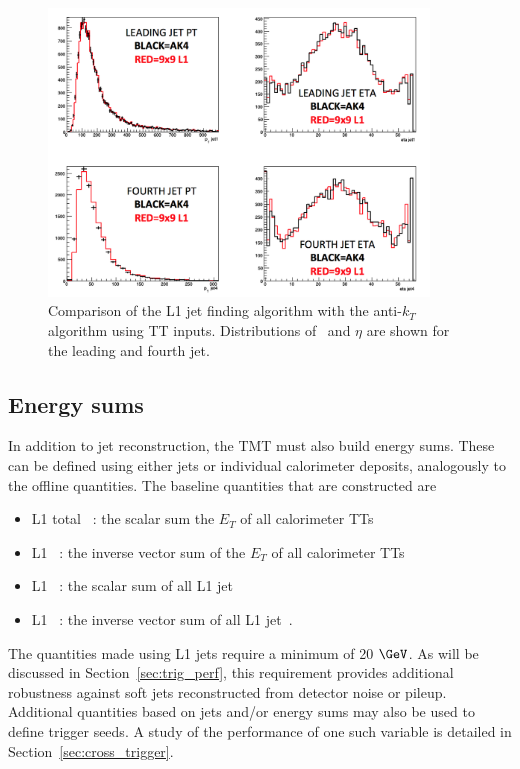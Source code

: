 \begin{figure}
\centering
    \includegraphics[width=0.9\textwidth]{./Figures/triggerUpgrade/jet_l1s2_compak4}
  \caption{Comparison of the L1 jet finding algorithm with the anti-$k_T$ algorithm using TT inputs. Distributions of \pt~and $\eta$ are shown for the leading and fourth
  jet.}
  \label{fig:jet_l1s2_compak4}
\end{figure}  
\subsection{Energy sums}

In addition to jet reconstruction, the TMT must also build energy sums. 
These can be defined using either jets or individual calorimeter deposits, analogously to
the offline quantities. The baseline quantities that are constructed are

\begin{itemize}
\item L1 total \Et~: the scalar sum the $E_T$ of all calorimeter TTs
\item L1 \met~: the inverse vector sum of the $E_T$ of all calorimeter TTs
\item L1 \scalht~: the scalar sum of all L1 jet~\pt
\item L1 \mht~: the inverse vector sum of all L1 jet~\pt.
\end{itemize}

The quantities made using L1 jets require a minimum \pt of 20 $\GeV$. As will be discussed in 
Section~\ref{sec:trig_perf}, this requirement provides additional robustness against soft
jets reconstructed from detector noise or pileup. Additional quantities based 
on jets and/or energy sums may also be used to define trigger seeds. 
A study of the performance of one such variable is detailed in Section~\ref{sec:cross_trigger}.

